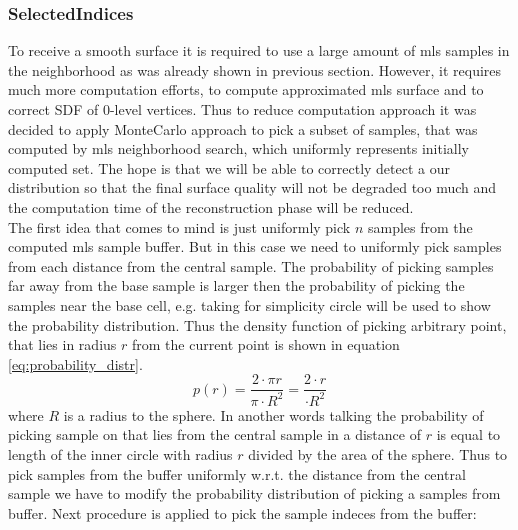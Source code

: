 \subsubsection{SelectedIndices}
To receive a smooth surface it is required to use a large amount of mls samples in the neighborhood as was already shown in previous section. However, it requires much more computation efforts, to compute approximated mls surface and to correct SDF of 0-level vertices. Thus to reduce computation approach it was decided to apply MonteCarlo approach to pick a subset of samples, that was computed by mls neighborhood search, which uniformly represents initially computed set. The hope is that we will be able to correctly detect a our distribution so that the final surface quality will not be degraded too much and the computation time of the reconstruction phase will be reduced.\\
The first idea that comes to mind is just uniformly pick $n$ samples from the computed mls sample buffer. But in this case we need to uniformly pick samples from each distance from the central sample. The probability of picking samples far away from the base sample is larger then the probability of picking the samples near the base cell, e.g. taking for simplicity circle will be used to show  the probability distribution. Thus the density  function of picking arbitrary point, that lies in radius $r$ from the current point is shown in equation \ref{eq:probability_distr}.
\begin{equation}
	p(r) = \dfrac{2 \cdot \pi r}{\pi \cdot R^2} = \dfrac{2 \cdot r}{\cdot R^2}
	\label{eq:probability_distr}
\end{equation}
where $R$ is a radius to the sphere. In another words talking the probability of picking sample on that lies from the central sample in a distance of $r$ is equal to length of the inner circle with radius $r$ divided by the area of the sphere.
Thus to pick samples from the buffer uniformly w.r.t. the distance from the central sample we have to modify the probability distribution of picking a samples from buffer. Next procedure is applied to pick the sample indeces from the buffer:
